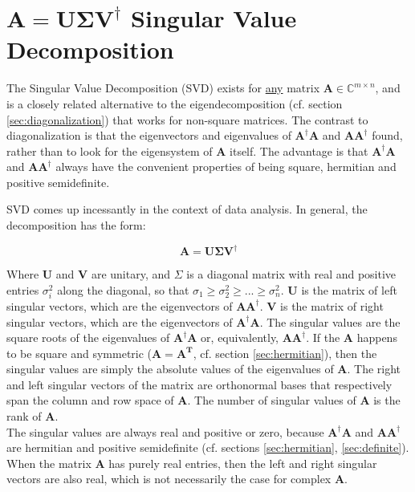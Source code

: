 \section{$\mathbf{A} = \mathbf{U\Sigma V}^{\dagger}$ Singular Value Decomposition}
\label{sec:svd}

The Singular Value Decomposition (SVD) exists for \underline{any} matrix $\mathbf{A}\in\mathbb{C}^{m\times n}$, and is a closely related alternative to the eigendecomposition (cf. section \ref{sec:diagonalization}) that works for non-square matrices. The contrast to diagonalization is that the eigenvectors and eigenvalues of $\mathbf{A}^{\dagger}\mathbf{A}$ and $\mathbf{A}\mathbf{A}^{\dagger}$ found, rather than to look for the eigensystem of $\mathbf{A}$ itself. The advantage is that $\mathbf{A}^{\dagger}\mathbf{A}$ and $\mathbf{A}\mathbf{A}^{\dagger}$ always have the convenient properties of being square, hermitian and positive semidefinite. 

SVD comes up incessantly in the context of data analysis. In general, the decomposition has the form:

\begin{equation}
\mathbf{A} = \mathbf{U\Sigma V^{\dagger}}
\end{equation}

Where $\mathbf{U}$ and $\mathbf{V}$ are unitary, and $\Sigma$ is a diagonal matrix with real and positive entries $\sigma_i^2$ along the diagonal, so that $\sigma_1 \geq \sigma^2_2 \geq ...\geq \sigma^2_n$. $\mathbf{U}$ is the matrix of left singular vectors, which are the eigenvectors of $\mathbf{A A^{\dagger}}$. $\mathbf{V}$ is the matrix of right singular vectors, which are the eigenvectors of $\mathbf{A^{\dagger} A}$. The singular values are the square roots of the eigenvalues of $\mathbf{A^{\dagger}A}$ or, equivalently, $\mathbf{AA^{\dagger}}$. If the $\mathbf{A}$ happens to be square and symmetric ($\mathbf{A}=\mathbf{A^T}$, cf. section \ref{sec:hermitian}), then the singular values are simply the absolute values of the eigenvalues of $\mathbf{A}$. The right and left singular vectors of the matrix are orthonormal bases that respectively span the column and row space of $\mathbf{A}$. The number of singular values of $\mathbf{A}$ is the rank of $\mathbf{A}$.
\\
The singular values are always real and positive or zero, because $\mathbf{A^{\dagger} A}$ and $\mathbf{A A^{\dagger}}$ are  hermitian and positive semidefinite (cf. sections \ref{sec:hermitian}, \ref{sec:definite}). When the matrix $\mathbf{A}$ has purely real entries, then the left and right singular vectors are also real, which is not necessarily the case for complex $\mathbf{A}$.
\\

